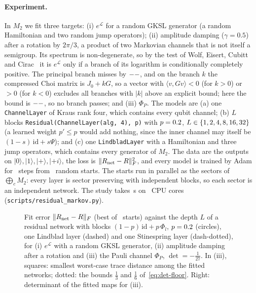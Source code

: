 \paragraph{Experiment.} In $M_2$ we fit three targets: (i) $e^{\mathcal L}$ for a random GKSL generator (a random
Hamiltonian and two random jump operators); (ii) amplitude damping ($\gamma=0.5$) after a rotation by $2\pi/3$, a
product of two Markovian channels that is not itself a semigroup. Its spectrum is non-degenerate, so by the test of
Wolf, Eisert, Cubitt and Cirac~\cite{wolf2008} it is $e^{\mathcal L}$ only if a branch of its logarithm is
conditionally completely positive. The principal branch misses by $--$, and on the branch $k$
the compressed Choi matrix is $J_0+kG$, so a vector with $\langle v,Gv\rangle<0$ (for $k>0$) or $>0$ (for $k<0$)
excludes all branches with $|k|$ above an explicit bound; here the bound is $--$, so no branch passes;
and (iii) $\Phi_P$. The models are (a) one \texttt{ChannelLayer} of Kraus rank four, which contains every qubit
channel; (b) $L$ blocks \texttt{Residual(ChannelLayer(alg, 4), p)} with $p=0.2$, $L\in\{1, 2, 4, 8, 16, 32\}$ (a learned
weight $p'\le p$ would add nothing, since the inner channel may itself be $(1-s)\,\mathrm{id}+s\Psi$); and (c) one
\texttt{LindbladLayer} with a Hamiltonian and three jump operators, which contains every generator of $M_2$. The data
are the outputs on $|0\rangle,|1\rangle,|{+}\rangle,|{+i}\rangle$, the loss is $\|R_{\rm net}-R\|_F^2$, and every
model is trained by Adam for \RMSteps\ steps from \RMRestarts\ random starts. The starts run in parallel as the
sectors of $\bigoplus_cM_2$: every layer is sector preserving with independent blocks, so each sector is an independent
network. The study takes \RMSeconds\,s on \RMWorkers\ CPU cores (\texttt{scripts/residual\_markov.py}).

\begin{figure}[t]
\centering
{}
\caption{Fit error $\|R_{\rm net}-R\|_F$ (best of \RMRestarts\ starts) against the depth $L$ of a residual network
with blocks $(1-p)\,\mathrm{id}+p\,\Phi_l$, $p=0.2$ (circles), one Lindblad layer (dashed) and one Stinespring layer
(dash-dotted), for (i) $e^{\mathcal L}$ with a random GKSL generator, (ii) amplitude damping after a rotation and
(iii) the Pauli channel $\Phi_P$, $\det=-\tfrac1{27}$. In (iii), squares: smallest worst-case trace distance among
the fitted networks; dotted: the bounds $\tfrac13$ and $\tfrac16$ of~\eqref{eq:det-floor}. Right: determinant of the
fitted maps for (iii).}
\label{fig:residual-markov}
\end{figure}

